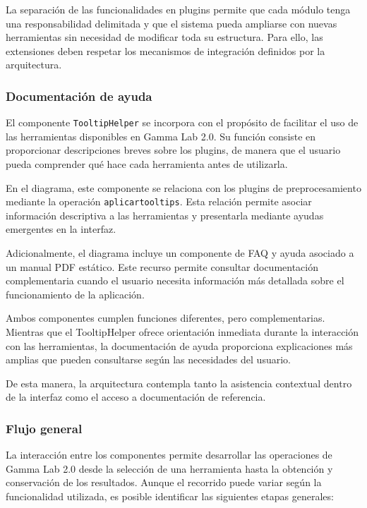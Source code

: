 \documentclass[11pt,a4paper]{article}
\DeclareRobustCommand{\_}{\textunderscore\allowbreak}
\begin{document}
La separación de las funcionalidades en plugins permite que cada módulo tenga una responsabilidad delimitada y que el sistema pueda ampliarse con nuevas herramientas sin necesidad de modificar toda su estructura. Para ello, las extensiones deben respetar los mecanismos de integración definidos por la arquitectura.

\subsubsection{Documentación de ayuda}

El componente \texttt{TooltipHelper} se incorpora con el propósito de facilitar el uso de las herramientas disponibles en Gamma Lab 2.0. Su función consiste en proporcionar descripciones breves sobre los plugins, de manera que el usuario pueda comprender qué hace cada herramienta antes de utilizarla.

En el diagrama, este componente se relaciona con los plugins de preprocesamiento mediante la operación \texttt{aplicar\_tooltips}. Esta relación permite asociar información descriptiva a las herramientas y presentarla mediante ayudas emergentes en la interfaz.

Adicionalmente, el diagrama incluye un componente de FAQ y ayuda asociado a un manual PDF estático. Este recurso permite consultar documentación complementaria cuando el usuario necesita información más detallada sobre el funcionamiento de la aplicación.

Ambos componentes cumplen funciones diferentes, pero complementarias. Mientras que el TooltipHelper ofrece orientación inmediata durante la interacción con las herramientas, la documentación de ayuda proporciona explicaciones más amplias que pueden consultarse según las necesidades del usuario.

De esta manera, la arquitectura contempla tanto la asistencia contextual dentro de la interfaz como el acceso a documentación de referencia.

\subsubsection{Flujo general}

La interacción entre los componentes permite desarrollar las operaciones de Gamma Lab 2.0 desde la selección de una herramienta hasta la obtención y conservación de los resultados. Aunque el recorrido puede variar según la funcionalidad utilizada, es posible identificar las siguientes etapas generales:
\end{document}
